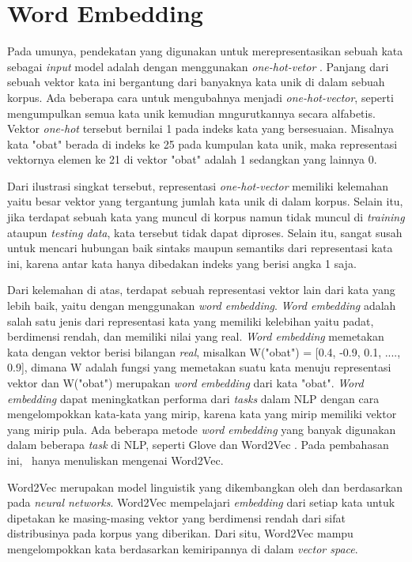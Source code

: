 \section{Word Embedding}
Pada umunya, pendekatan yang digunakan untuk merepresentasikan sebuah kata sebagai \textit{input} model adalah dengan menggunakan \textit{one-hot-vetor} \citep{turian2010word}. Panjang dari sebuah vektor kata ini bergantung dari banyaknya kata unik di dalam sebuah korpus. Ada beberapa cara untuk mengubahnya menjadi \textit{one-hot-vector}, seperti mengumpulkan semua kata unik kemudian mngurutkannya secara alfabetis. Vektor \textit{one-hot} tersebut bernilai 1 pada indeks kata yang bersesuaian. Misalnya kata "obat" berada di indeks ke 25 pada kumpulan kata unik, maka representasi vektornya elemen ke 21 di vektor "obat" adalah 1 sedangkan yang lainnya 0.

Dari ilustrasi singkat tersebut, representasi \textit{one-hot-vector} memiliki kelemahan yaitu besar vektor yang tergantung jumlah kata unik di dalam korpus. Selain itu, jika terdapat sebuah kata yang muncul di korpus namun tidak muncul di \textit{training} ataupun \textit{testing data}, kata tersebut tidak dapat diproses. Selain itu, sangat susah untuk mencari hubungan baik sintaks maupun semantiks dari representasi kata ini, karena antar kata hanya dibedakan indeks yang berisi angka 1 saja.

Dari kelemahan di atas, terdapat sebuah representasi vektor lain dari kata yang lebih baik, yaitu dengan menggunakan \textit{word embedding}. \textit{Word embedding} adalah salah satu jenis dari representasi kata yang memiliki kelebihan yaitu padat, berdimensi rendah, dan memiliki nilai yang real. \textit{Word embedding} memetakan kata dengan vektor berisi bilangan \textit{real}, misalkan W("obat") = [0.4, -0.9, 0.1, ...., 0.9], dimana W adalah fungsi yang memetakan suatu kata menuju representasi vektor dan W("obat") merupakan \textit{word embedding} dari kata "obat". \textit{Word embedding} dapat meningkatkan performa dari \textit{tasks} dalam NLP dengan cara mengelompokkan kata-kata yang mirip, karena kata yang mirip memiliki vektor yang mirip pula. Ada beberapa metode \textit{word embedding} yang banyak digunakan dalam beberapa \textit{task} di NLP, seperti Glove \citep{pennington2014glove} dan Word2Vec \citep{mikolov2014word2vec}. Pada pembahasan ini, \saya~hanya menuliskan mengenai Word2Vec.

Word2Vec merupakan model linguistik yang dikembangkan oleh \cite{mikolov2014word2vec} dan berdasarkan pada \textit{neural networks}. Word2Vec mempelajari \textit{embedding} dari setiap kata untuk dipetakan ke masing-masing vektor yang berdimensi rendah dari sifat distribusinya pada korpus yang diberikan. Dari situ, Word2Vec mampu mengelompokkan kata berdasarkan kemiripannya di dalam \textit{vector space}.

